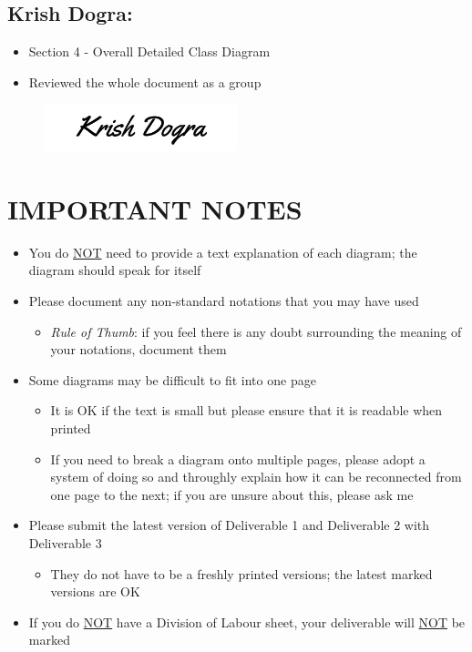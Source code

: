 \documentclass[]{article}
\begin{document}
\subsection*{Krish Dogra:}
\begin{itemize}
	\item Section 4 - Overall Detailed Class Diagram
	\item Reviewed the whole document as a group
\end{itemize}
\begin{figure}[h]
	\centering
	\includegraphics[width=0.5\textwidth]{../images/KrishSignature.jpg}
	\label{fig:signature}
\end{figure}

\newpage
\section*{IMPORTANT NOTES}
\begin{itemize}
	\item You do \underline{NOT} need to provide a text explanation of each diagram; the diagram should speak for itself
	\item Please document any non-standard notations that you may have used
	      \begin{itemize}
		      \item \emph{Rule of Thumb}: if you feel there is any doubt surrounding the meaning of your notations, document them
	      \end{itemize}
	\item Some diagrams may be difficult to fit into one page
	      \begin{itemize}
		      \item It is OK if the text is small but please ensure that it is readable when printed
		      \item If you need to break a diagram onto multiple pages, please adopt a system of doing so and throughly explain how it can be reconnected from one page to the next; if you are unsure about this, please ask me
	      \end{itemize}
	\item Please submit the latest version of Deliverable 1 and Deliverable 2 with Deliverable 3
	      \begin{itemize}
		      \item They do not have to be a freshly printed versions; the latest marked versions are OK
	      \end{itemize}
	\item If you do \underline{NOT} have a Division of Labour sheet, your deliverable will \underline{NOT} be marked
\end{itemize}
\end{document}
